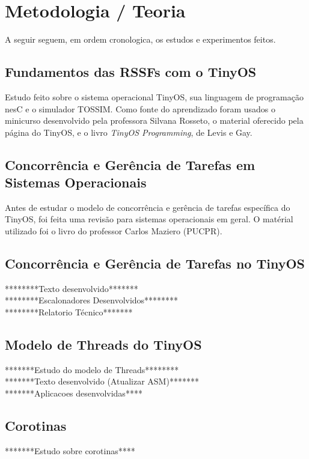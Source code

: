 \documentclass[a4paper,onecolumn, 10pt]{article}
\begin{document}
\section{Metodologia / Teoria}\label{metodologia}
A seguir seguem, em ordem cronologica, os estudos e experimentos feitos.

\subsection{Fundamentos das RSSFs com o TinyOS}
Estudo feito sobre o sistema operacional TinyOS, sua linguagem de programação nesC e o simulador TOSSIM.
Como fonte do aprendizado foram usados o minicurso desenvolvido pela professora Silvana Rosseto\cite{minicurso}, o material oferecido
pela página do TinyOS\cite{siteTinyOS}, e o livro \textit{TinyOS Programming}, de Levis e Gay\cite{tinyosprogramming}.

\subsection{Concorrência e Gerência de Tarefas em Sistemas Operacionais}
Antes de estudar o modelo de concorrência e gerência de tarefas específica do TinyOS, foi feita uma revisão para
sistemas operacionais em geral. O matérial utilizado foi o livro do professor Carlos Maziero (PUCPR)\cite{maziero}.

\subsection{Concorrência e Gerência de Tarefas no TinyOS}
********Texto desenvolvido******* \\
********Escalonadores Desenvolvidos******** \\
********Relatorio Técnico******* \\

\subsection{Modelo de Threads do TinyOS}
*******Estudo do modelo de Threads******** \\
*******Texto desenvolvido (Atualizar ASM)******* \\
*******Aplicacoes desenvolvidas****

\subsection{Corotinas}
*******Estudo sobre corotinas**** \\
\end{document}
